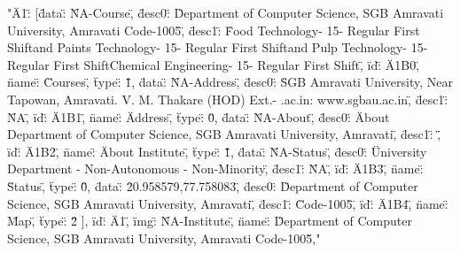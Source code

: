 "{\"A1\" : [{\"data\" : \"NA-Course\", \"desc0\" : \"Department of Computer Science, SGB Amravati University, Amravati Code-1005\", \"desc1\" : \"Food Technology\nIntake - 15\nType - Regular First Shift\n\nOil and Paints Technology\nIntake - 15\nType - Regular First Shift\n\nPaper and Pulp Technology\nIntake - 15\nType - Regular First Shift\n\nPetro Chemical Engineering\nIntake - 15\nType - Regular First Shift\", \"id\" : \"A1B0\", \"name\" : \"Courses\", \"type\" : \"1\"}, {\"data\" : \"NA-Address\", \"desc0\" : \"SGB Amravati University, Near Tapowan, Amravati\nDr. V. M. Thakare (HOD) Ext.- \nreg@sgbau.ac.in\nwebsite: www.sgbau.ac.in\", \"desc1\" : \"NA\", \"id\" : \"A1B1\", \"name\" : \"Address\", \"type\" : \"0\"}, {\"data\" : \"NA-About\", \"desc0\" : \"About Department of Computer Science, SGB Amravati University, Amravati\", \"desc1\" : \"\", \"id\" : \"A1B2\", \"name\" : \"About Institute\", \"type\" : \"1\"}, {\"data\" : \"NA-Status\", \"desc0\" : \"University Department - Non-Autonomous - Non-Minority\", \"desc1\" : \"NA\", \"id\" : \"A1B3\", \"name\" : \"Status\", \"type\" : \"0\"}, {\"data\" : \"20.958579,77.758083\", \"desc0\" : \"Department of Computer Science, SGB Amravati University, Amravati\", \"desc1\" : \"Code-1005\", \"id\" : \"A1B4\", \"name\" : \"Map\", \"type\" : \"2\"} ], \"id\" : \"A1\", \"img\" : \"NA-Institute\", \"name\" : \"Department of Computer Science, SGB Amravati University, Amravati Code-1005\"},"